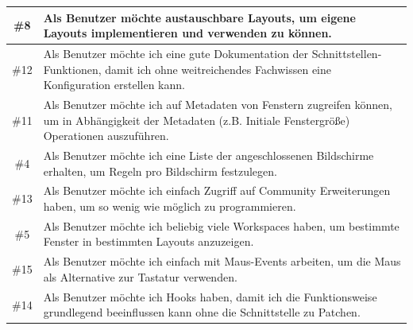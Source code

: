 \documentclass{article}
\begin{document}
\begin{tabularx}{\textwidth}{|c|X|}
	\#8  & Als Benutzer möchte austauschbare Layouts, um eigene Layouts implementieren und verwenden zu können.                                                        \\
	\hline
	\#12 & Als Benutzer möchte ich eine gute Dokumentation der Schnittstellen-Funktionen, damit ich ohne weitreichendes Fachwissen eine Konfiguration erstellen kann.  \\
	\hline
	\#11 & Als Benutzer möchte ich auf Metadaten von Fenstern zugreifen können, um in Abhängigkeit der Metadaten (z.B. Initiale Fenstergröße) Operationen auszuführen. \\
	\hline
	\#4  & Als Benutzer möchte ich eine Liste der angeschlossenen Bildschirme erhalten, um Regeln pro Bildschirm festzulegen.                                          \\
	\hline
	\#13 & Als Benutzer möchte ich einfach Zugriff auf Community Erweiterungen haben, um so wenig wie möglich zu programmieren.                                        \\
	\hline
	\#5  & Als Benutzer möchte ich beliebig viele Workspaces haben, um bestimmte Fenster in bestimmten Layouts anzuzeigen.                                             \\
	\hline
	\#15 & Als Benutzer möchte ich einfach mit Maus-Events arbeiten, um die Maus als Alternative zur Tastatur verwenden.                                               \\
	\hline
	\#14 & Als Benutzer möchte ich Hooks haben, damit ich die Funktionsweise grundlegend beeinflussen kann ohne die Schnittstelle zu Patchen.                          \\
	\hline
\end{tabularx}
\end{document}
